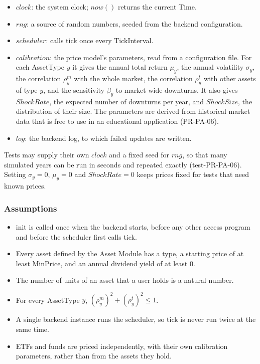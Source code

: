 \documentclass[12pt, titlepage]{article}
\begin{document}
\begin{itemize}
\item $\mathit{clock}$: the system clock; $\mathit{now}()$ returns the
  current Time.
\item $\mathit{rng}$: a source of random numbers, seeded from the backend
  configuration.
\item $\mathit{scheduler}$: calls tick once every \textsf{TickInterval}.
\item $\mathit{calibration}$: the price model's parameters, read from a
  configuration file. For each AssetType $y$ it gives the annual total return
  $\mu_y$, the annual volatility $\sigma_y$, the correlation $\rho^m_y$ with
  the whole market, the correlation $\rho^t_y$ with other assets of type $y$,
  and the sensitivity $\beta_y$ to market-wide downturns. It also gives
  $\mathit{ShockRate}$, the expected number of downturns per year, and
  $\mathit{ShockSize}$, the distribution of their size. The parameters are
  derived from historical market data that is free to use in an educational
  application (PR-PA-06).
\item $\mathit{log}$: the backend log, to which failed updates are written.
\end{itemize}

\noindent Tests may supply their own $\mathit{clock}$ and a fixed seed for
$\mathit{rng}$, so that many simulated years can be run in seconds and
repeated exactly (test-PR-PA-06). Setting $\sigma_y = 0$, $\mu_y = 0$ and
$\mathit{ShockRate} = 0$ keeps prices fixed for tests that need known prices.

\subsubsection{Assumptions}

\begin{itemize}
\item init is called once when the backend starts, before any other access
  program and before the scheduler first calls tick.
\item Every asset defined by the Asset Module has a type, a starting price of
  at least \textsf{MinPrice}, and an annual dividend yield of at least 0.
\item The number of units of an asset that a user holds is a natural number.
\item For every AssetType $y$, $(\rho^m_y)^2 + (\rho^t_y)^2 \leq 1$.
\item A single backend instance runs the scheduler, so tick is never run
  twice at the same time.
\item ETFs and funds are priced independently, with their own calibration
  parameters, rather than from the assets they hold.
\end{itemize}
\end{document}
